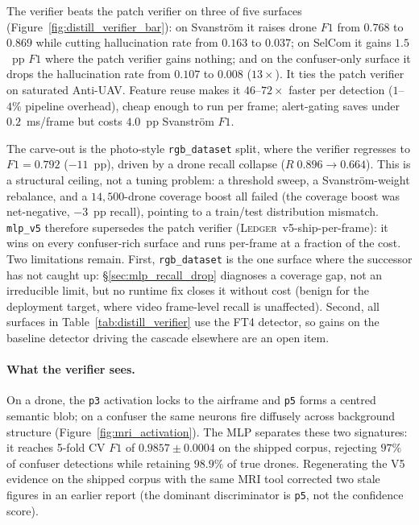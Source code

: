 The verifier beats the patch verifier on three of five surfaces (Figure~\ref{fig:distill_verifier_bar}): on Svanstr\"om it raises drone $F1$ from $0.768$ to $0.869$ while cutting hallucination rate from $0.163$ to $0.037$; on SelCom it gains $1.5$~pp $F1$ where the patch verifier gains nothing; and on the confuser-only surface it drops the hallucination rate from $0.107$ to $0.008$ ($13\times$). It ties the patch verifier on saturated Anti-UAV. Feature reuse makes it $46$--$72\times$ faster per detection ($1$--$4\%$ pipeline overhead), cheap enough to run per frame; alert-gating saves under $0.2$~ms/frame but costs $4.0$~pp Svanstr\"om $F1$.

The carve-out is the photo-style \texttt{rgb\_dataset} split, where the verifier regresses to $F1=0.792$ ($-11$~pp), driven by a drone recall collapse ($R\;0.896 \to 0.664$). This is a structural ceiling, not a tuning problem: a threshold sweep, a Svanstr\"om-weight rebalance, and a $14{,}500$-drone coverage boost all failed (the coverage boost was net-negative, $-3$~pp recall), pointing to a train/test distribution mismatch. \texttt{mlp\_v5} therefore supersedes the patch verifier (\textsc{Ledger}~v5-ship-per-frame): it wins on every confuser-rich surface and runs per-frame at a fraction of the cost. Two limitations remain. First, \texttt{rgb\_dataset} is the one surface where the successor has not caught up: \S\ref{sec:mlp_recall_drop} diagnoses a coverage gap, not an irreducible limit, but no runtime fix closes it without cost (benign for the deployment target, where video frame-level recall is unaffected). Second, all surfaces in Table~\ref{tab:distill_verifier} use the FT4 detector, so gains on the baseline detector driving the cascade elsewhere are an open item.

\paragraph{What the verifier sees.}
On a drone, the \texttt{p3} activation locks to the airframe and \texttt{p5} forms a centred semantic blob; on a confuser the same neurons fire diffusely across background structure (Figure~\ref{fig:mri_activation}). The MLP separates these two signatures: it reaches 5-fold CV $F1$ of $0.9857\pm0.0004$ on the shipped corpus, rejecting $97\%$ of confuser detections while retaining $98.9\%$ of true drones. Regenerating the V5 evidence on the shipped corpus with the same MRI tool corrected two stale figures in an earlier report (the dominant discriminator is \texttt{p5}, not the confidence score).

